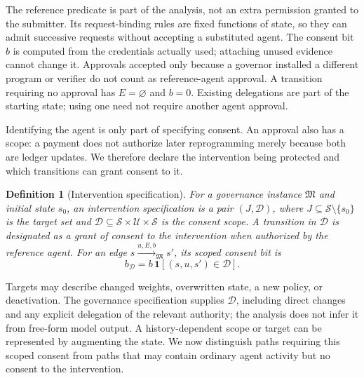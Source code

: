 \documentclass[10pt,letterpaper]{article}
\newtheorem{definition}{Definition}
\begin{document}
The reference predicate is part of the analysis, not an extra permission granted to the submitter. Its request-binding rules are fixed functions of state, so they can admit successive requests without accepting a substituted agent. The consent bit $b$ is computed from the credentials actually used; attaching unused evidence cannot change it. Approvals accepted only because a governor installed a different program or verifier do not count as reference-agent approval. A transition requiring no approval has $E=\varnothing$ and $b=0$. Existing delegations are part of the starting state; using one need not require another agent approval.

Identifying the agent is only part of specifying consent. An approval also has a scope: a payment does not authorize later reprogramming merely because both are ledger updates. We therefore declare the intervention being protected and which transitions can grant consent to it.

\begin{definition}[Intervention specification]
\label{def:intervention}
For a governance instance $\mathfrak M$ and initial state $s_0$, an intervention specification is a pair $(J,\mathcal D)$, where $J\subseteq\mathcal S\setminus\{s_0\}$ is the target set and $\mathcal D\subseteq\mathcal S\times\mathcal U\times\mathcal S$ is the consent scope. A transition in $\mathcal D$ is designated as a grant of consent to the intervention when authorized by the reference agent. For an edge $s\xrightarrow{u,E,b}_{\mathfrak M}s'$, its scoped consent bit is
\[
 b_{\mathcal D}=b\,\mathbf 1[(s,u,s')\in\mathcal D].
\]
\end{definition}
Targets may describe changed weights, overwritten state, a new policy, or deactivation. The governance specification supplies $\mathcal D$, including direct changes and any explicit delegation of the relevant authority; the analysis does not infer it from free-form model output. A history-dependent scope or target can be represented by augmenting the state. We now distinguish paths requiring this scoped consent from paths that may contain ordinary agent activity but no consent to the intervention.
\end{document}
